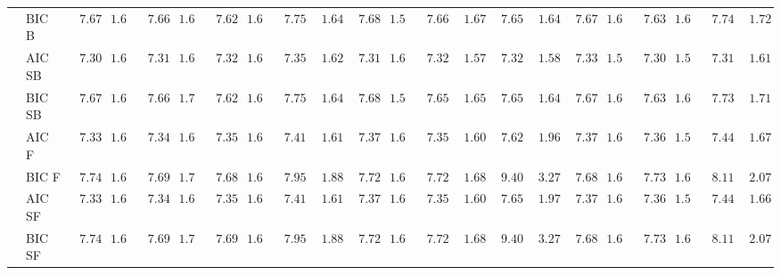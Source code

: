 \begin{tabular}{ll|ll|llllll|llllll|llllll}
 & BIC B  & $\phantom{0}7.67$ & $1.66$ & $\phantom{0}7.66$ & $1.69$ & $\phantom{0}7.62$ & $1.63$ & $\phantom{0}7.75$ & $\phantom{0}1.64$ & $\phantom{0}7.68$ & $1.59$ & $\phantom{0}7.66$ & $\phantom{0}1.67$ & $\phantom{0}7.65$ & $\phantom{0}1.64$ & $\phantom{0}7.67$ & $1.66$ & $\phantom{0}7.63$ & $1.64$ & $\phantom{0}7.74$ & $\phantom{0}1.72$ \\
 & AIC SB  & $\phantom{0}7.30$ & $1.60$ & $\phantom{0}7.31$ & $1.61$ & $\phantom{0}7.32$ & $1.62$ & $\phantom{0}7.35$ & $\phantom{0}1.62$ & $\phantom{0}7.31$ & $1.61$ & $\phantom{0}7.32$ & $\phantom{0}1.57$ & $\phantom{0}7.32$ & $\phantom{0}1.58$ & $\phantom{0}7.33$ & $1.59$ & $\phantom{0}7.30$ & $1.57$ & $\phantom{0}7.31$ & $\phantom{0}1.61$ \\
 & BIC SB  & $\phantom{0}7.67$ & $1.66$ & $\phantom{0}7.66$ & $1.70$ & $\phantom{0}7.62$ & $1.63$ & $\phantom{0}7.75$ & $\phantom{0}1.64$ & $\phantom{0}7.68$ & $1.59$ & $\phantom{0}7.65$ & $\phantom{0}1.65$ & $\phantom{0}7.65$ & $\phantom{0}1.64$ & $\phantom{0}7.67$ & $1.66$ & $\phantom{0}7.63$ & $1.64$ & $\phantom{0}7.73$ & $\phantom{0}1.71$ \\
 & AIC F  & $\phantom{0}7.33$ & $1.60$ & $\phantom{0}7.34$ & $1.61$ & $\phantom{0}7.35$ & $1.61$ & $\phantom{0}7.41$ & $\phantom{0}1.61$ & $\phantom{0}7.37$ & $1.61$ & $\phantom{0}7.35$ & $\phantom{0}1.60$ & $\phantom{0}7.62$ & $\phantom{0}1.96$ & $\phantom{0}7.37$ & $1.60$ & $\phantom{0}7.36$ & $1.58$ & $\phantom{0}7.44$ & $\phantom{0}1.67$ \\
 & BIC F  & $\phantom{0}7.74$ & $1.64$ & $\phantom{0}7.69$ & $1.72$ & $\phantom{0}7.68$ & $1.63$ & $\phantom{0}7.95$ & $\phantom{0}1.88$ & $\phantom{0}7.72$ & $1.61$ & $\phantom{0}7.72$ & $\phantom{0}1.68$ & $\phantom{0}9.40$ & $\phantom{0}3.27$ & $\phantom{0}7.68$ & $1.68$ & $\phantom{0}7.73$ & $1.64$ & $\phantom{0}8.11$ & $\phantom{0}2.07$ \\
 & AIC SF  & $\phantom{0}7.33$ & $1.60$ & $\phantom{0}7.34$ & $1.61$ & $\phantom{0}7.35$ & $1.61$ & $\phantom{0}7.41$ & $\phantom{0}1.61$ & $\phantom{0}7.37$ & $1.61$ & $\phantom{0}7.35$ & $\phantom{0}1.60$ & $\phantom{0}7.65$ & $\phantom{0}1.97$ & $\phantom{0}7.37$ & $1.60$ & $\phantom{0}7.36$ & $1.58$ & $\phantom{0}7.44$ & $\phantom{0}1.66$ \\
 & BIC SF  & $\phantom{0}7.74$ & $1.64$ & $\phantom{0}7.69$ & $1.72$ & $\phantom{0}7.69$ & $1.64$ & $\phantom{0}7.95$ & $\phantom{0}1.88$ & $\phantom{0}7.72$ & $1.61$ & $\phantom{0}7.72$ & $\phantom{0}1.68$ & $\phantom{0}9.40$ & $\phantom{0}3.27$ & $\phantom{0}7.68$ & $1.68$ & $\phantom{0}7.73$ & $1.64$ & $\phantom{0}8.11$ & $\phantom{0}2.07$ \\

\end{tabular}
